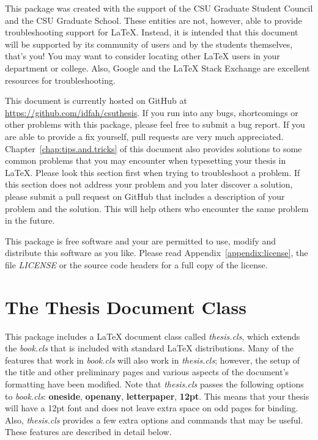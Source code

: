 \documentclass[master]{thesis}
\newcommand{\cref}[1]{Chapter~\ref{#1}}  %
\newcommand{\aref}[1]{Appendix~\ref{#1}} %
\begin{document}
This package was created with the support of the CSU Graduate Student Council and the CSU Graduate School.  These entities are not, however, able to provide troubleshooting support for \LaTeX{}.  Instead, it is intended that this document will be supported by its community of users and by the students themselves, that's you!  You may want to consider locating other \LaTeX{} users in your department or college.  Also, Google and the \LaTeX{} Stack Exchange are excellent resources for troubleshooting.

This document is currently hosted on GitHub at \url{https://github.com/idfah/csuthesis}.  If you run into any bugs, shortcomings or other problems with this package, please feel free to submit a bug report.  If you are able to provide a fix yourself, pull requests are very much appreciated.  \cref{chap:tips.and.tricks} of this document also provides solutions to some common problems that you may encounter when typesetting your thesis in LaTeX.  Please look this section first when trying to troubleshoot a problem.  If this section does not address your problem and you later discover a solution, please submit a pull request on GitHub that includes a description of your problem and the solution.  This will help others who encounter the same problem in the future.

This package is free software and your are permitted to use, modify and distribute this software as you like.  Please read \aref{appendix:license}, the file \textit{LICENSE} or the source code headers for a full copy of the license.

\chapter{The Thesis Document Class}
\label{chap:thesiscls}

This package includes a \LaTeX{} document class called \textit{thesis.cls}, which extends the \textit{book.cls} that is included with standard \LaTeX{} distributions.  Many of the features that work in \textit{book.cls} will also work in \textit{thesis.cls}; however, the setup of the title and other preliminary pages and various aspects of the document's formatting have been modified.  Note that \textit{thesis.cls} passes the following options to \textit{book.cls}: \textbf{oneside}, \textbf{openany}, \textbf{letterpaper}, \textbf{12pt}.  This means that your thesis will have a 12pt font and does not leave extra space on odd pages for binding.  Also, \textit{thesis.cls} provides a few extra options and commands that may be useful.  These features are described in detail below.
\end{document}
